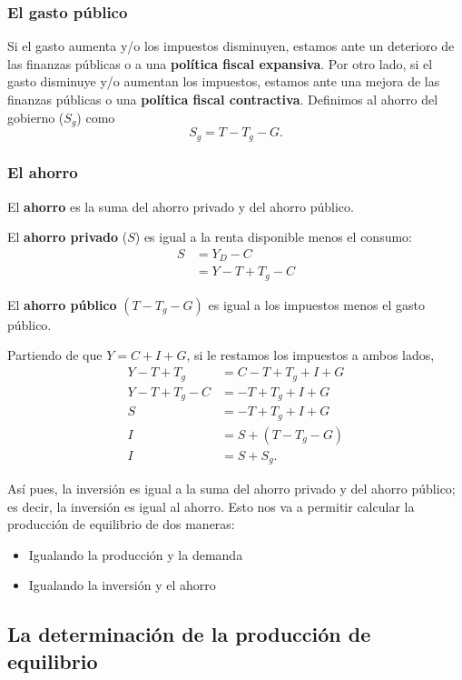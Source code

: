 \documentclass[10pt]{article}
\begin{document}
\begin{multicols*}{2}
\subsubsection{El gasto público}
Si el gasto aumenta y/o los impuestos disminuyen, estamos ante un deterioro de las finanzas públicas o a una \textbf{política fiscal expansiva}. Por otro lado, si el gasto disminuye y/o aumentan los impuestos, estamos ante una mejora de las finanzas públicas o una \textbf{política fiscal contractiva}. Definimos al ahorro del gobierno ($S_g$) como 
\[ S_g = T - T_g - G. \]

\subsubsection{El ahorro}
El \textbf{ahorro} es la suma del ahorro privado y del ahorro público.

El \textbf{ahorro privado} ($S$) es igual a la renta disponible menos el consumo:
\begin{align*}
    S &= Y_D - C \\
      &= Y - T + T_g - C
\end{align*}

El \textbf{ahorro público} $(T-T_g-G)$ es igual a los impuestos menos el gasto público.

Partiendo de que $Y=C+I+G$, si le restamos los impuestos a ambos lados,
\begin{align*}
    Y-T+T_g &= C-T + T_g + I + G \\
    Y-T+T_g - C &= -T + T_g + I + G \\
    S &= -T + T_g + I + G \\
    I &= S + (T-T_g - G) \\
    I &= S + S_g.
\end{align*}

Así pues, la inversión es igual a la suma del ahorro privado y del ahorro público; es decir, la inversión es igual al ahorro. Esto nos va a permitir calcular la producción de equilibrio de dos maneras:
\begin{itemize}
    \item Igualando la producción y la demanda
    \item Igualando la inversión y el ahorro
\end{itemize}

\subsection{La determinación de la producción de equilibrio}


\end{multicols*}
\end{document}
